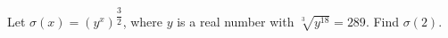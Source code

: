 Let $\sigma(x)=\left(y^x\right)^{\dfrac32}$, where $y$ is a real number with $\sqrt[3]{y^{18}}=289$. Find $\sigma(2)$.
